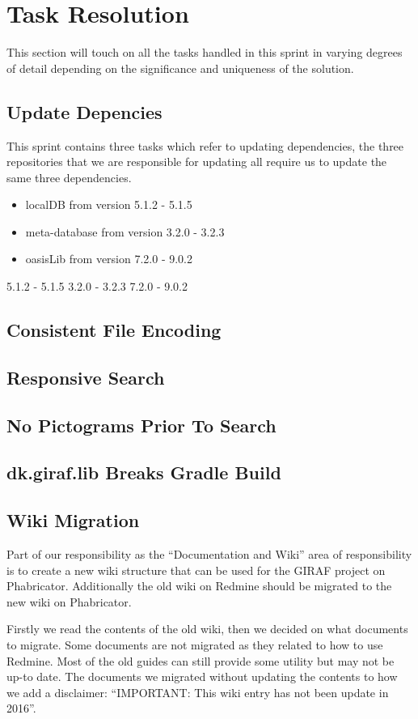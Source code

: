 \section{Task Resolution}
This section will touch on all the tasks handled in this sprint in varying degrees of detail depending on the significance and uniqueness of the solution.

\subsection{Update Depencies}
This sprint contains three tasks which refer to updating dependencies, the three repositories that we are responsible for updating all require us to update the same three dependencies.
\begin{itemize}
    \item localDB from version 5.1.2 - 5.1.5
    \item meta-database from version 3.2.0 - 3.2.3
    \item oasisLib from version 7.2.0 - 9.0.2
\end{itemize}


5.1.2 - 5.1.5
3.2.0 - 3.2.3
7.2.0 - 9.0.2
\subsection{Consistent File Encoding}
\subsection{Responsive Search}
\subsection{No Pictograms Prior To Search}
\subsection{dk.giraf.lib Breaks Gradle Build}
\subsection{Wiki Migration}
Part of our responsibility as the ``Documentation and Wiki'' area of responsibility is to create a new wiki structure that can be used for the GIRAF project on Phabricator.
Additionally the old wiki on Redmine should be migrated to the new wiki on Phabricator. 

Firstly we read the contents of the old wiki, then we decided on what documents to migrate. 
Some documents are not migrated as they related to how to use Redmine. 
Most of the old guides can still provide some utility but may not be up-to date.
The documents we migrated without updating the contents to how we add a disclaimer: ``IMPORTANT: This wiki entry has not been update in 2016''.


